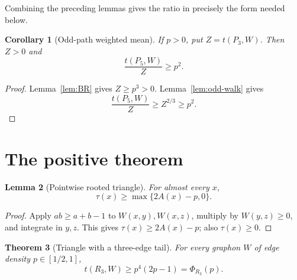 \documentclass[11pt]{article}
\newtheorem{theorem}{Theorem}[section]
\newtheorem{lemma}[theorem]{Lemma}
\newtheorem{corollary}[theorem]{Corollary}
\begin{document}
Combining the preceding lemmas gives the ratio in precisely the form needed
below.

\begin{corollary}[Odd-path weighted mean]
\label{cor:path-ratio}
If $p>0$, put $Z=t(P_3,W)$.  Then $Z>0$ and
\[
 \frac{t(P_5,W)}{Z}\geq p^2.
\]
\end{corollary}

\begin{proof}
Lemma~\ref{lem:BR} gives $Z\geq p^3>0$.  Lemma~\ref{lem:odd-walk} gives
\[
 \frac{t(P_5,W)}Z\geq Z^{2/3}\geq p^2.
\]
\end{proof}


\section{The positive theorem}
\label{sec:positive}

\begin{lemma}[Pointwise rooted triangle]
\label{lem:rooted-triangle}
For almost every $x$,
\[
 \tau(x)\geq\max\{2A(x)-p,0\}.
\]
\end{lemma}

\begin{proof}
Apply $ab\geq a+b-1$ to $W(x,y),W(x,z)$, multiply by
$W(y,z)\geq0$, and integrate in $y,z$.  This gives
$\tau(x)\geq2A(x)-p$; also $\tau(x)\geq0$.
\end{proof}

\begin{theorem}[Triangle with a three-edge tail]
\label{thm:main}
For every graphon $W$ of edge density $p\in[1/2,1]$,
\[
 \boxed{
 t(R_3,W)\geq p^4(2p-1)=\Phi_{R_3}(p).
 }
\]
\end{theorem}
\end{document}
